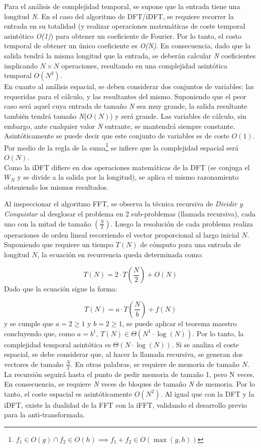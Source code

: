 	Para el análisis de complejidad temporal, se supone que la entrada tiene una longitud \emph{N}. En el caso del algoritmo de DFT/iDFT, se requiere recorrer la entrada en su totalidad (y realizar operaciones matemáticas de coste temporal asintótico \emph{O(1)}) para obtener un coeficiente de Fourier. Por lo tanto, el costo temporal de obtener un único coeficiente es \emph{O(N)}. En consecuencia, dado que la salida tendrá la misma longitud que la entrada, se deberán calcular \emph{N} coeficientes implicando $N \times N$ operaciones, resultando en una complejidad asintótica temporal $O(N^{2})$.\\
	En cuanto al análisis espacial, se deben considerar dos conjuntos de variables: las requeridas para el cálculo, y las resultantes del mismo. Suponiendo que el peor caso será aquel cuya entrada de tamaño \emph{N} sea muy grande, la salida resultante también tendrá tamaño \emph{N}($O(N)$) y será grande. Las variables de cálculo, sin embargo, ante cualquier valor \emph{N} entrante, se mantendrá siempre constante. Asintóticamente se puede decir que este conjunto de variables es de coste $O(1)$. Por medio de la regla de la suma\footnote{$f_1 \in O(g) \cap f_2 \in O(h) \implies f_1 + f_2 \in O(\max(g,h))$} se infiere que la complejidad espacial será $O(N)$.\\
	Como la iDFT difiere en dos operaciones matemáticas de la DFT (se conjuga el $W_N$ y se divide a la salida por la longitud), se aplica el mismo razonamiento obteniendo los mismos resultados.

	Al inspeccionar el algoritmo FFT, se observa la técnica recursiva de \emph{Dividir y Conquistar} al desglosar el problema en 2 sub-problemas (llamada recursiva), cada uno con la mitad de tamaño $\left(\frac{N}{2}\right)$. Luego la resolución de cada problema realiza operaciones de orden lineal recorriendo el vector proporcional al largo inicial $N$. Suponiendo que requiere un tiempo $T(N)$ de cómputo para una entrada de longitud $N$, la ecuación en recurrencia queda determinada como:

		\begin{equation*}
			T(N) = 2 \cdot T\left(\frac{N}{2}\right) + O(N)
		\end{equation*}
	Dado que la ecuación sigue la forma:

		\begin{equation*}
			T(N) = a \cdot T\left(\frac{N}{b}\right) + f(N)
		\end{equation*}
	y se cumple que $a=2\geq1$ y $b=2\geq1$, se puede aplicar el teorema maestro concluyendo que, como $a=b^1$, $T(N)\in \Theta(N^1 \cdot \log(N))$. Por lo tanto, la complejidad temporal asintótica es $\Theta(N\cdot \log(N))$.
	Si se analiza el coste espacial, se debe considerar que, al hacer la llamada recursiva, se generan dos vectores de tamaño $\frac{N}{2}$. En otras palabras, se requiere de memoria de tamaño $N$. La recursión seguirá hasta el punto de pedir memoria de tamaño 1, pero N veces. En consecuencia, se requiere \emph{N} veces de bloques de tamaño \emph{N} de memoria. Por lo tanto, el coste espacial es asintóticamente $O(N^2)$.
	Al igual que con la DFT y la iDFT, existe la dualidad de la FFT con la iFFT, validando el desarrollo previo para la anti-transformada.	
